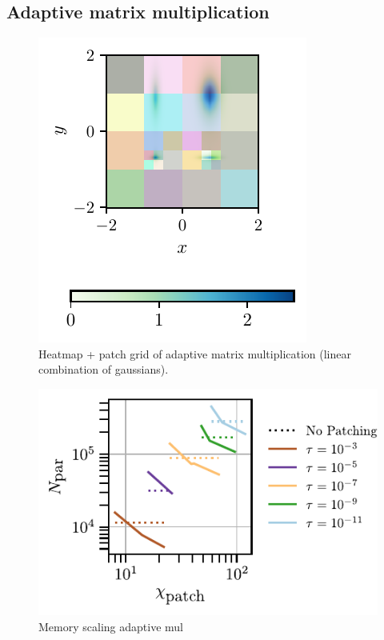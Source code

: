 \subsection{Adaptive matrix multiplication}


\begin{figure}[ht!]
    \centering
    \includegraphics{figures/AdaptiveMulHeatmap.pdf}
    \caption{Heatmap + patch grid of adaptive matrix multiplication (linear combination of gaussians). }
\end{figure}

\begin{figure}[ht!]
    \centering
    \includegraphics{figures/adaptiveMulMemory.pdf}
    \caption{Memory scaling adaptive mul}
\end{figure}




